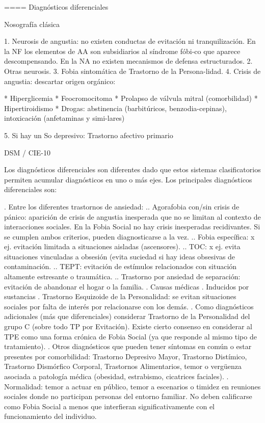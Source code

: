 \documentclass{scrbook}
\begin{document}
==== Diagnósticos diferenciales

Nosografía clásica

1. Neurosis de angustia: no existen conductas de evitación ni tranquilización. En la NF los elementos de AA son subsidiarios al síndrome fóbi-co que aparece descompensando. En la NA no existen mecanismos de defensa estructurados.
2. Otras neurosis.
3. Fobia sintomática de Trastorno de la Persona-lidad.
4. Crisis de angustia: descartar origen orgánico:

* Hiperglicemia
* Feocromocitoma
* Prolapso de válvula mitral (comorbilidad)
* Hipertiroidismo
* Drogas: abstinencia (barbitúricos, benzodia-cepinas), intoxicación (anfetaminas y simi-lares)

5. Si hay un So depresivo: Trastorno afectivo primario

DSM / CIE-10

Los diagnósticos diferenciales son diferentes dado que estos sistemas clasificatorios permiten acumular diagnósticos en uno o más ejes. Los principales diagnósticos diferenciales son:

. Entre los diferentes trastornos de ansiedad:
.. Agorafobia con/sin crisis de pánico: aparición de crisis de angustia inesperada que no se limitan al contexto de interacciones sociales. En la Fobia Social no hay crisis inesperadas recidivantes. Si se cumplen ambos criterios, pueden diagnosticarse a la vez.
.. Fobia específica: x ej. evitación limitada a situaciones aisladas (ascensores).
.. TOC: x ej. evita situaciones vinculadas a obsesión (evita suciedad si hay ideas obsesivas de contaminación.
.. TEPT: evitación de estímulos relacionados con situación altamente estresante o traumática.
.. Trastorno por ansiedad de separación: evitación de abandonar el hogar o la familia.
. Causas médicas
. Inducidos por sustancias
. Trastorno Esquizoide de la Personalidad: se evitan situaciones sociales por falta de interés por relacionarse con los demás.
. Como diagnósticos adicionales (más que diferenciales) considerar Trastorno de la Personalidad del grupo C (sobre todo TP por Evitación). Existe cierto consenso en considerar al TPE como una forma crónica de Fobia Social (ya que responde al mismo tipo de tratamiento).
. Otros diagnósticos que pueden tener síntomas en común o estar presentes por comorbilidad: Trastorno Depresivo Mayor, Trastorno Distímico, Trastorno Dismórfico Corporal, Trastornos Alimentarios, temor o vergüenza asociada a patología médica (obesidad, estrabismo, cicatrices faciales).
. Normalidad: temor a actuar en público, temor a escenarios o timidez en reuniones sociales donde no participan personas del entorno familiar. No deben calificarse como Fobia Social a menos que interfieran significativamente con el funcionamiento del individuo.
\end{document}
